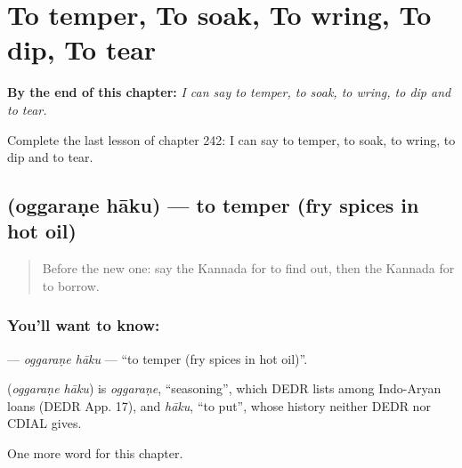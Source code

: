 
\chapter{To temper, To soak, To wring, To dip, To tear}
\label{ch:ka-to-temper-to-soak-to-wring-to-dip-to-tear}

\begin{chapteropening}
\textbf{By the end of this chapter:} \emph{I can say to temper, to soak, to wring, to dip and to tear.}

Complete the last lesson of chapter 242: I can say to temper, to soak, to wring, to dip and to tear.
\end{chapteropening}

\section[\texorpdfstring{\kn{ಒಗ್ಗರಣೆ} \kn{ಹಾಕು} (oggaraṇe hāku)}{ಒಗ್ಗರಣೆ ಹಾಕು (oggaraṇe hāku)}]{  (oggaraṇe hāku) — to temper (fry spices in hot oil)}

\label{lesson:KA-C242-oggarane-haku}



\begin{quote}
Before the new one: say the Kannada for to find out, then the Kannada for to borrow.
\end{quote}

\subsection*{You'll want to know:  }
\textbf{ } — \emph{oggaraṇe hāku} — \textquotedblleft{}to temper (fry spices in hot oil)\textquotedblright{}.

\begin{cousinweb}
\textbf{ } (\emph{oggaraṇe hāku}) is \emph{oggaraṇe}, \textquotedblleft{}seasoning\textquotedblright{}, which DEDR lists among Indo-Aryan loans (DEDR App. 17), and \emph{hāku}, \textquotedblleft{}to put\textquotedblright{}, whose history neither DEDR nor CDIAL gives.
\end{cousinweb}

\begin{grammarlens}[title={What you've built}]
One more word for this chapter.
\end{grammarlens}


